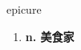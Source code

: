 
\begin{frame}
{\huge epicure}
\begin{center}
\begin{enumerate}\Large
  \item \textbf{n. 美食家}
\end{enumerate}
\end{center}
\end{frame}
